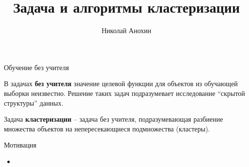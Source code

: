 \documentclass[aspectratio=169]{beamer}
\author{Николай Анохин}
\title{Задача и алгоритмы кластеризации}
\date{}
\begin{document}
\begin{frame}
\titlepage
\end{frame}

\begin{frame}{Обучение без учителя}

В задачах {\bf без учителя} значение целевой функции для объектов из обучающей выборки неизвестно. Решение таких задач подразумевает исследование ``скрытой структуры'' данных.

\vspace{2em}
Задача {\bf кластеризации} -- задача без учителя, подразумевающая разбиение множества объектов на непересекающиеся подмножества (кластеры).

\end{frame}

\begin{frame}{Мотивация}

\begin{itemize}
\item
{}
\end{itemize}


\end{frame}
\end{document}
